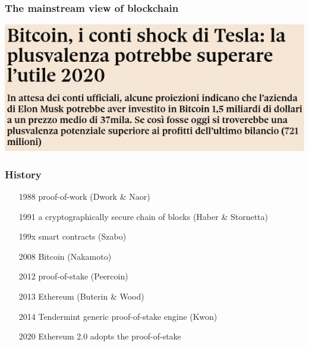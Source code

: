 \documentclass[11pt]{beamer}  %
\begin{document}
\begin{frame}
\end{frame}

\begin{frame}\frametitle{The mainstream view of blockchain}

  \begin{center}
    \includegraphics[scale=0.4,clip=false]{pictures/tesla.png}
  \end{center}

\end{frame}

\begin{frame}\frametitle{History}

  \begin{itemize}
  \item[1988] proof-of-work (Dwork \& Naor)
  \item[1991] a cryptographically secure chain of blocks (Haber \& Stornetta)
  \item[199x] smart contracts (Szabo)
  \item[2008] Bitcoin (Nakamoto)
  \item[2012] proof-of-stake (Peercoin)
  \item[2013] Ethereum (Buterin \& Wood)
  \item[2014] Tendermint generic proof-of-stake engine (Kwon)
  \item[2020] Ethereum 2.0 adopts the proof-of-stake
  \end{itemize}
  
\end{frame}
\end{document}
